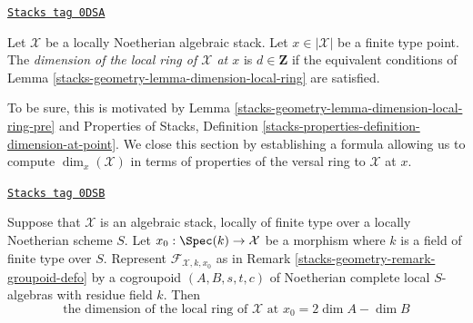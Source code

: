 \begin{definition}
\label{stacks-geometry-definition-dimension-local-ring}
\href{https://stacks.math.columbia.edu/tag/0DSA}{\texttt{Stacks tag 0DSA}}

Let $\mathcal{X}$ be a locally Noetherian algebraic stack.
Let $x \in |\mathcal{X}|$ be a finite type point.
The {\it dimension of the local ring of $\mathcal{X}$ at $x$}
is $d \in \mathbf{Z}$ if the equivalent conditions of
Lemma \ref{stacks-geometry-lemma-dimension-local-ring} are satisfied.
\end{definition}

To be sure, this is motivated by Lemma \ref{stacks-geometry-lemma-dimension-local-ring-pre}
and Properties of Stacks, Definition
\ref{stacks-properties-definition-dimension-at-point}.
We close this section by establishing a formula allowing us to
compute $\dim_x(\mathcal{X})$ in terms of properties of the versal ring
to $\mathcal{X}$ at $x$.

\begin{lemma}
\label{stacks-geometry-lemma-dimension-formula}
\href{https://stacks.math.columbia.edu/tag/0DSB}{\texttt{Stacks tag 0DSB}}

Suppose that $\mathcal{X}$ is an algebraic stack, locally of finite type
over a locally Noetherian scheme $S$. Let $x_0 : \Spec(k) \to \mathcal{X}$
be a morphism where $k$ is a field of finite type over $S$. Represent
$\mathcal{F}_{\mathcal{X}, k, x_0}$ as in Remark \ref{stacks-geometry-remark-groupoid-defo}
by a cogroupoid $(A, B, s, t, c)$ of Noetherian complete local $S$-algebras
with residue field $k$. Then
$$
\text{the dimension of the local ring of }\mathcal{X}\text{ at }x_0 =
2\dim A - \dim B
$$
\end{lemma}

